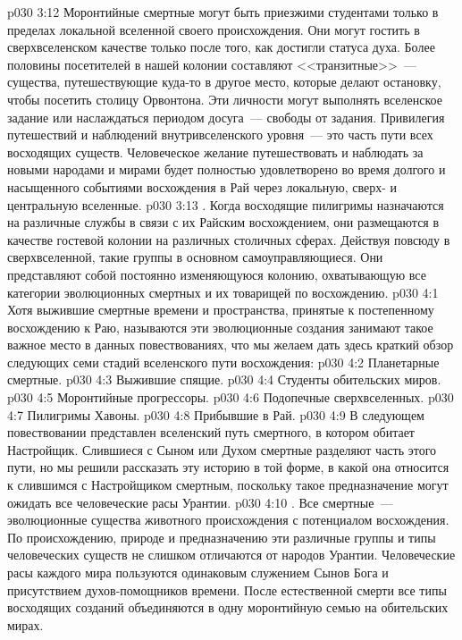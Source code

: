 \vs p030 3:12 Моронтийные смертные могут быть приезжими студентами только в пределах локальной вселенной своего происхождения. Они могут гостить в сверхвселенском качестве только после того, как достигли статуса духа. Более половины посетителей в нашей колонии составляют <<транзитные>>~--- существа, путешествующие куда\hyp{}то в другое место, которые делают остановку, чтобы посетить столицу Орвонтона. Эти личности могут выполнять вселенское задание или наслаждаться периодом досуга~--- свободы от задания. Привилегия путешествий и наблюдений внутривселенского уровня~--- это часть пути всех восходящих существ. Человеческое желание путешествовать и наблюдать за новыми народами и мирами будет полностью удовлетворено во время долгого и насыщенного событиями восхождения в Рай через локальную, сверх\hyp{} и центральную вселенные.
\vs p030 3:13 . Когда восходящие пилигримы назначаются на различные службы в связи с их Райским восхождением, они размещаются в качестве гостевой колонии на различных столичных сферах. Действуя повсюду в сверхвселенной, такие группы в основном самоуправляющиеся. Они представляют собой постоянно изменяющуюся колонию, охватывающую все категории эволюционных смертных и их товарищей по восхождению.
\vs p030 4:1 Хотя выжившие смертные времени и пространства, принятые к постепенному восхождению к Раю, называются  эти эволюционные создания занимают такое важное место в данных повествованиях, что мы желаем дать здесь краткий обзор следующих семи стадий вселенского пути восхождения:
\vs p030 4:2 Планетарные смертные.
\vs p030 4:3 Выжившие спящие.
\vs p030 4:4 Студенты обительских миров.
\vs p030 4:5 Моронтийные прогрессоры.
\vs p030 4:6 Подопечные сверхвселенных.
\vs p030 4:7 Пилигримы Хавоны.
\vs p030 4:8 Прибывшие в Рай.
\vs p030 4:9 \pc В следующем повествовании представлен вселенский путь смертного, в котором обитает Настройщик. Слившиеся с Сыном или Духом смертные разделяют часть этого пути, но мы решили рассказать эту историю в той форме, в какой она относится к слившимся с Настройщиком смертным, поскольку такое предназначение могут ожидать все человеческие расы Урантии.
\vs p030 4:10 . Все смертные~--- эволюционные существа животного происхождения с потенциалом восхождения. По происхождению, природе и предназначению эти различные группы и типы человеческих существ не слишком отличаются от народов Урантии. Человеческие расы каждого мира пользуются одинаковым служением Сынов Бога и присутствием духов\hyp{}помощников времени. После естественной смерти все типы восходящих созданий объединяются в одну моронтийную семью на обительских мирах.

